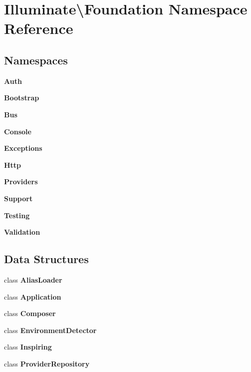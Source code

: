\section{Illuminate\textbackslash{}Foundation Namespace Reference}
\label{namespace_illuminate_1_1_foundation}
\subsection*{Namespaces}
\begin{DoxyCompactItemize}
\item 
 {\bf Auth}
\item 
 {\bf Bootstrap}
\item 
 {\bf Bus}
\item 
 {\bf Console}
\item 
 {\bf Exceptions}
\item 
 {\bf Http}
\item 
 {\bf Providers}
\item 
 {\bf Support}
\item 
 {\bf Testing}
\item 
 {\bf Validation}
\end{DoxyCompactItemize}
\subsection*{Data Structures}
\begin{DoxyCompactItemize}
\item 
class {\bf Alias\+Loader}
\item 
class {\bf Application}
\item 
class {\bf Composer}
\item 
class {\bf Environment\+Detector}
\item 
class {\bf Inspiring}
\item 
class {\bf Provider\+Repository}
\end{DoxyCompactItemize}
